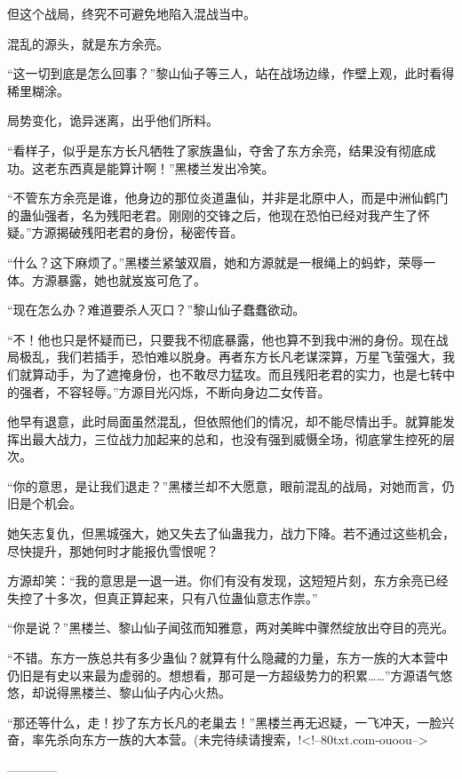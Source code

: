 \begin{this_body}
但这个战局，终究不可避免地陷入混战当中。

混乱的源头，就是东方余亮。

“这一切到底是怎么回事？”黎山仙子等三人，站在战场边缘，作壁上观，此时看得稀里糊涂。

局势变化，诡异迷离，出乎他们所料。

“看样子，似乎是东方长凡牺牲了家族蛊仙，夺舍了东方余亮，结果没有彻底成功。这老东西真是能算计啊！”黑楼兰发出冷笑。

“不管东方余亮是谁，他身边的那位炎道蛊仙，并非是北原中人，而是中洲仙鹤门的蛊仙强者，名为残阳老君。刚刚的交锋之后，他现在恐怕已经对我产生了怀疑。”方源揭破残阳老君的身份，秘密传音。

“什么？这下麻烦了。”黑楼兰紧皱双眉，她和方源就是一根绳上的蚂蚱，荣辱一体。方源暴露，她也就岌岌可危了。

“现在怎么办？难道要杀人灭口？”黎山仙子蠢蠢欲动。

“不！他也只是怀疑而已，只要我不彻底暴露，他也算不到我中洲的身份。现在战局极乱，我们若插手，恐怕难以脱身。再者东方长凡老谋深算，万星飞萤强大，我们就算动手，为了遮掩身份，也不敢尽力猛攻。而且残阳老君的实力，也是七转中的强者，不容轻辱。”方源目光闪烁，不断向身边二女传音。

他早有退意，此时局面虽然混乱，但依照他们的情况，却不能尽情出手。就算能发挥出最大战力，三位战力加起来的总和，也没有强到威慑全场，彻底掌生控死的层次。

“你的意思，是让我们退走？”黑楼兰却不大愿意，眼前混乱的战局，对她而言，仍旧是个机会。

她矢志复仇，但黑城强大，她又失去了仙蛊我力，战力下降。若不通过这些机会，尽快提升，那她何时才能报仇雪恨呢？

方源却笑：“我的意思是一退一进。你们有没有发现，这短短片刻，东方余亮已经失控了十多次，但真正算起来，只有八位蛊仙意志作祟。”

“你是说？”黑楼兰、黎山仙子闻弦而知雅意，两对美眸中骤然绽放出夺目的亮光。

“不错。东方一族总共有多少蛊仙？就算有什么隐藏的力量，东方一族的大本营中仍旧是有史以来最为虚弱的。想想看，那可是一方超级势力的积累……”方源语气悠悠，却说得黑楼兰、黎山仙子内心火热。

“那还等什么，走！抄了东方长凡的老巢去！”黑楼兰再无迟疑，一飞冲天，一脸兴奋，率先杀向东方一族的大本营。(未完待续请搜索，!<!--80txt.com-ouoou-->

------------

\end{this_body}

